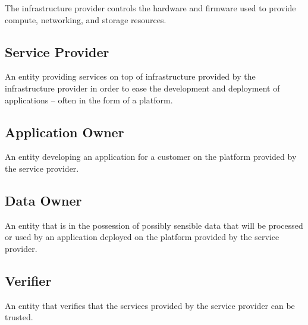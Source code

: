 The infrastructure provider controls the hardware and firmware used to provide
compute, networking, and storage resources.

\subsection*{Service Provider}

An entity providing services on top of infrastructure provided by the
infrastructure provider in order to ease the development and deployment of
applications -- often in the form of a platform.

\subsection*{Application Owner}

An entity developing an application for a customer on the platform provided by
the service provider.

\subsection*{Data Owner}

An entity that is in the possession of possibly sensible data that will be
processed or used by an application deployed on the platform provided by the
service provider.

\subsection*{Verifier}

An entity that verifies that the services provided by the service provider can
be trusted.
